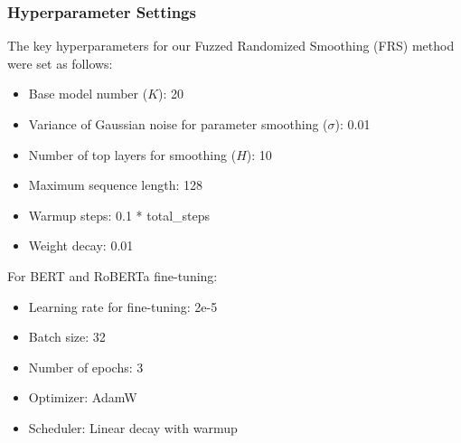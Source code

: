 \subsubsection{Hyperparameter Settings}
The key hyperparameters for our Fuzzed Randomized Smoothing (FRS) method were set as follows:
\begin{itemize}[leftmargin=*]
    \item Base model number ($K$): 20
    \item Variance of Gaussian noise for parameter smoothing ($\sigma$): 0.01
    \item Number of top layers for smoothing ($H$): 10
    \item Maximum sequence length: 128
    \item Warmup steps: 0.1 * total\_steps
    \item Weight decay: 0.01
\end{itemize}

For BERT and RoBERTa fine-tuning:
\begin{itemize}[leftmargin=*]
    \item Learning rate for fine-tuning: 2e-5
    \item Batch size: 32
    \item Number of epochs: 3
    \item Optimizer: AdamW
    \item Scheduler: Linear decay with warmup
\end{itemize}

